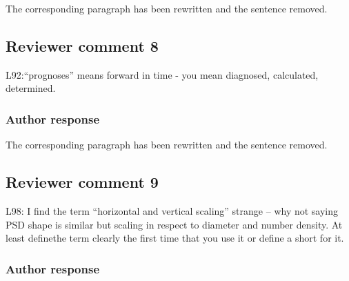 The corresponding paragraph has been rewritten and the sentence removed.

%


\subsection*{Reviewer comment 8}

L92:“prognoses”   means   forward   in   time   -   you   mean   diagnosed,   calculated,
determined.

\subsubsection*{Author response}

The corresponding paragraph has been rewritten and the sentence removed.



\subsection*{Reviewer comment 9}

L98: I find the term “horizontal and vertical scaling” strange – why not saying
PSD shape is similar but scaling in respect to diameter and number density. At
least definethe term clearly the first time that you use it or define a short
for it.

\subsubsection*{Author response}
 
